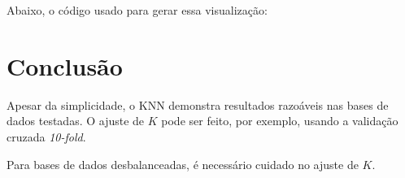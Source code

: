 \documentclass[a4paper]{article}
\begin{document}
Abaixo, o código usado para gerar essa visualização:



\section{Conclusão}

Apesar da simplicidade, o KNN demonstra resultados razoáveis nas bases de dados testadas. O ajuste de $K$ pode ser feito, por exemplo, usando a validação cruzada \textit{10-fold}.

Para bases de dados desbalanceadas, é necessário cuidado no ajuste de $K$.
\end{document}
